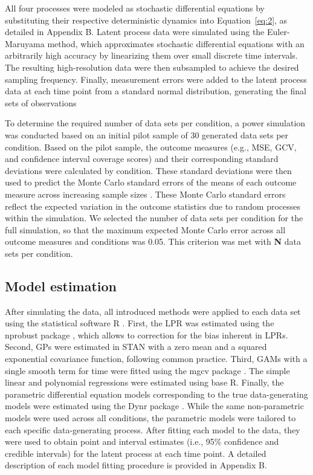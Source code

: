 \documentclass[man, floatsintext]{apa7}
\begin{document}
All four processes were modeled as stochastic differential equations by
substituting their respective deterministic dynamics into Equation~\ref{eq:2},
as detailed in Appendix B. Latent process data were simulated using the
Euler-Maruyama method, which approximates stochastic differential equations
with an arbitrarily high accuracy by linearizing them over small discrete time
intervals. The resulting high-resolution data were then subsampled to achieve
the desired sampling frequency. Finally, measurement errors were added to the
latent process data at each time point from a standard normal distribution,
generating the final sets of observations

To determine the required number of data sets per condition, a power simulation
was conducted based on an initial pilot sample of 30 generated data sets per
condition. Based on the pilot sample, the outcome measures (e.g., MSE, GCV, and
confidence interval coverage scores) and their corresponding standard
deviations were calculated by condition. These standard deviations were then
used to predict the Monte Carlo standard errors of the means of each outcome
measure across increasing sample sizes \parencite{siepe_simulation_2023}. These
Monte Carlo standard errors reflect the expected variation in the outcome
statistics due to random processes within the simulation. We selected the
number of data sets per condition for the full simulation, so that the maximum
expected Monte Carlo error across all outcome measures and conditions was 0.05.
This criterion was met with \textbf{N} data sets per condition.

\subsection{Model estimation}

After simulating the data, all introduced methods were applied to each data set
using the statistical software R \parencite{R-base}. First, the LPR was
estimated using the nprobust package \parencite{R-nprobust}, which allows to
correction for the bias inherent in LPRs. Second, GPs were estimated in STAN
\parencite{R-cmdstanr} with a zero mean and a squared exponential covariance
function, following common practice. Third, GAMs with a single smooth term for
time were fitted using the mgcv package \parencite{R-mgcv_a}. The simple linear
and polynomial regressions were estimated using base R. Finally, the
parametric differential equation models corresponding to the true
data-generating models were estimated using the Dynr package
\parencite{R-dynr}. While the same non-parametric models were used across all
conditions, the parametric models were tailored to each specific
data-generating process. After fitting each model to the data, they were used
to obtain point and interval estimates (i.e., 95\% confidence and credible
intervals) for the latent process at each time point. A detailed description of
each model fitting procedure is provided in Appendix B.
\end{document}
